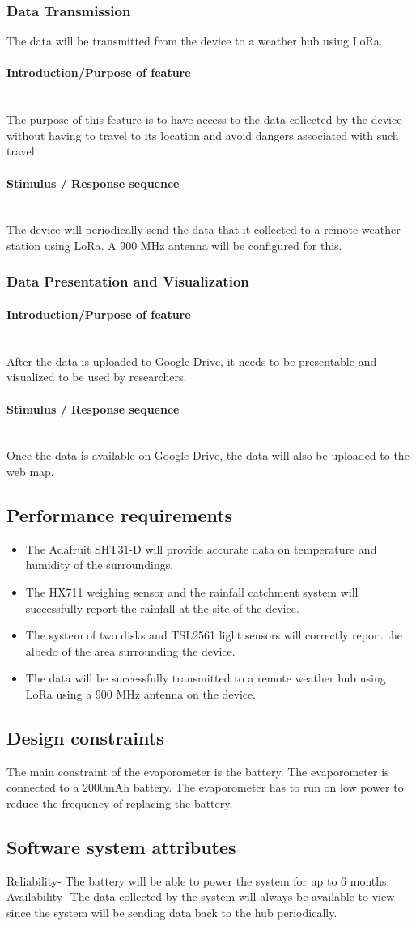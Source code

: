 \documentclass[onecolumn, draftclsnofoot,10pt, compsoc]{IEEEtran}
\newcommand{\subsubsubsection}[1]{\paragraph{#1}\mbox{}\\}
\begin{document}
\subsubsection{Data Transmission}
The data will be transmitted from the device to a weather hub using LoRa.
\subsubsubsection{Introduction/Purpose of feature}
The purpose of this feature is to have access to the data collected by the device without having to travel to its location and avoid dangers associated with such travel.
\subsubsubsection{Stimulus / Response sequence}
The device will periodically send the data that it collected to a remote weather station using LoRa. A 900 MHz antenna will be configured for this.
\subsubsection{Data Presentation and Visualization}
\subsubsubsection{Introduction/Purpose of feature}
After the data is uploaded to Google Drive, it needs to be presentable and visualized to be used by researchers.
\subsubsubsection{Stimulus / Response sequence}
Once the data is available on Google Drive, the data will also be uploaded to the web map.
\subsection{Performance requirements}
\begin{itemize}

\item The Adafruit SHT31-D will provide accurate data on temperature and humidity of the surroundings.
\item The HX711 weighing sensor and the rainfall catchment system will successfully report the rainfall at the site of the device.
\item The system of two disks and TSL2561 light sensors will correctly report the albedo of the area surrounding the device.
\item The data will be successfully transmitted to a remote weather hub using LoRa using a 900 MHz antenna on the device.
\end{itemize}
\subsection{Design constraints}
The main constraint of the evaporometer is the battery. The evaporometer is connected to a 2000mAh battery. The evaporometer has to run on low power to reduce the frequency of replacing the battery.
\subsection{Software system attributes}
Reliability- The battery will be able to power the system for up to 6 months.
Availability- The data collected by the system will always be available to view since the system will be sending data back to the hub periodically.
\end{document}

